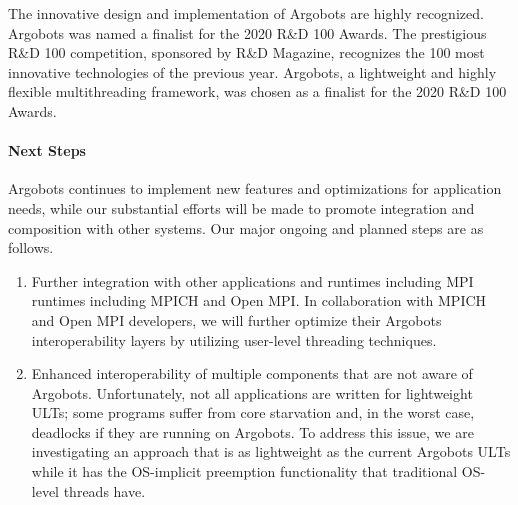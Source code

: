 The innovative design and implementation of Argobots are highly
recognized.  Argobots was named a finalist for the 2020 R\&D 100
Awards.  The prestigious R\&D 100 competition, sponsored by R\&D
Magazine, recognizes the 100 most innovative technologies of the
previous year.  Argobots, a lightweight and highly flexible
multithreading framework, was chosen as a finalist for the 2020 R\&D
100 Awards.

\paragraph{Next Steps}

Argobots continues to implement new features and optimizations for
application needs, while our substantial efforts will be made to
promote integration and composition with other systems. Our major
ongoing and planned steps are as follows.

\begin{enumerate}

\item Further integration with other applications and runtimes
including MPI runtimes including MPICH and Open MPI.  In collaboration
with MPICH and Open MPI developers, we will further optimize their
Argobots interoperability layers by utilizing user-level threading
techniques.

\item Enhanced interoperability of multiple components that are not
aware of Argobots.  Unfortunately, not all applications are written
for lightweight ULTs; some programs suffer from core starvation and,
in the worst case, deadlocks if they are running on Argobots.  To
address this issue, we are investigating an approach that is as
lightweight as the current Argobots ULTs while it has the OS-implicit
preemption functionality that traditional OS-level threads have.

\end{enumerate}
